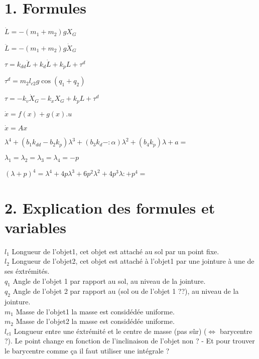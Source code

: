 \documentclass[a4paper,12pt]{report}
\begin{document}
\section*{1. Formules}

$\label{eq:L}
	\dot{L} = -( m_{1} + m_{2})gX_{G} $


$	\ddot{L} = -( m_{1} + m_{2})g\dot{X}_{G} $


$	\tau = k_{dd}\ddot{L} + k_{d}\dot{L} + k_{p}L + \tau^{d} $


$	\tau^{d} = m_{2} l_{c2} g \cos(q_{1} + q_{2}) $

$	\tau = - k_{v}\dot{X}_{G} - k_{x}X_{G} + k_{p}L + \tau^{d} $

$	\dot{x} = f(x) + g(x) . u $

$	\dot{x} = Ax $

$	\lambda^{4} + (b_{1} k_{dd} - b_{2} k_{p} )\lambda^{3} + (b_{3} k_{d} - : \alpha)\lambda^{2} + (b_{4} k_{p} )\lambda + a = $

$	\lambda_{1} = \lambda_{2} = \lambda_{3} = \lambda_{4} = -p $

$	(\lambda + p)^{4} = \lambda^{4} + 4p\lambda^{3} + 6p^{2}\lambda^{2} +  4p^{3}\lambda : +  p^{4} = $



\section*{2. Explication des formules et variables}
\label{sec:Explication des formules et variables}


$	l_{1} $
Longueur de l'objet1, cet objet est attaché au sol par un point fixe.\\

$	l_{2} $
Longueur de l'objet2, cet objet est attaché à l'objet1 par une jointure à une de ses éxtrémités.\\

$	q_{1} $
Angle de l'objet 1 par rapport au sol, au niveau de la jointure.\\

$	q_{2} $
Angle de l'objet 2 par rapport au (sol ou de l'objet 1 ??), au niveau de la jointure.\\


$	m_{1} $
Masse de l'objet1 la masse est considédée uniforme.\\

$	m_{2} $
Masse de l'objet2 la masse est considédée uniforme.\\

$	l_{c1} $
Longueur entre une éxtrémité et le centre de masse (pas sûr) ($\Longleftrightarrow$ barycentre ?). Le point change en fonction de l'inclinaison de l'objet non ? - Et pour trouver le barycentre comme ça il faut utiliser une intégrale ?\\
\end{document}
